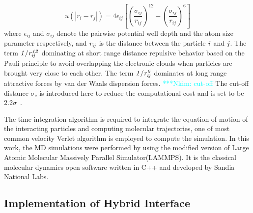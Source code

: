 \documentclass[conference,final]{IEEEtran}
\newcommand{\Nkimnote}[1]{ {\textcolor{cyan} { ***Nkim: #1 }}}
\newcommand{\skonote}[1]{ {\textcolor{blue} { ***Jeff: #1 }}}
\newcommand{\Nkimnote}[1]{}
\newcommand{\skonote}[1]{}
\begin{document}
\vspace{-.2em}
\begin{equation}
 u(|r_{i} - r_{j}|) = 4\epsilon_{ij}[(\frac{\sigma_{ij}}{r_{ij}})^{12}-(\frac{\sigma_{ij}}{r_{ij}})^{6}]
 \label{eq:LJ12}
\end{equation}
\normalsize
where $\epsilon_{ij}$ and $\sigma_{ij}$ denote the pairwise potential well depth and the atom size parameter respectively, and $\it r_{ij}$ is the distance between the particle $\it i$ and $\it j$.
The term $\it 1/r_{ij}^{12}$ dominating at short range distance repulsive behavior based on the Pauli principle to avoid overlapping the electronic clouds when particles are  brought very close to each other. The term $\it 1/r_{ij}^6$ dominates at long range attractive forces by van der Waals dispersion forces.
\Nkimnote{cut-off}
The cut-off distance $\sigma_{c}$ is introduced here to reduce the computational cost and is set to be 2.2$\sigma$~\cite{Travis}.
\newline

The time integration algorithm is required to integrate the equation of motion of the interacting particles and computing molecular trajectories, one of most common velocity Verlet algorithm is employed to compute the simulation.
In this work,  the MD simulations were performed by using the modified version of Large Atomic Molecular Massively Parallel Simulator(LAMMPS). It is the classical molecular dynamics open software written in C++ and developed by Sandia National Labs.~\cite{LAMMPS}


\subsection{Implementation of Hybrid Interface}

\end{document}
